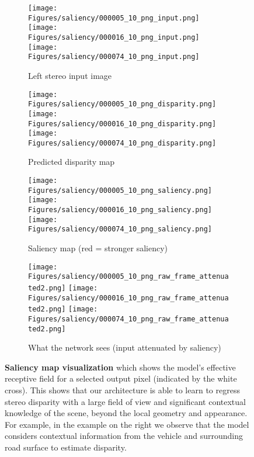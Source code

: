 \documentclass[10pt,twocolumn,letterpaper]{article}
\begin{document}
\begin{figure}[t]
	\begin{center}
    		\begin{subfigure}[t]{\linewidth}
            \centering
            \texttt{[image: Figures/saliency/000005\_10\_png\_input.png]}
            \texttt{[image: Figures/saliency/000016\_10\_png\_input.png]}
            \texttt{[image: Figures/saliency/000074\_10\_png\_input.png]}
	        \caption{Left stereo input image}
		\end{subfigure}
    		\begin{subfigure}[t]{\linewidth}
            \centering
            \texttt{[image: Figures/saliency/000005\_10\_png\_disparity.png]}
            \texttt{[image: Figures/saliency/000016\_10\_png\_disparity.png]}
            \texttt{[image: Figures/saliency/000074\_10\_png\_disparity.png]}
	        \caption{Predicted disparity map}
		\end{subfigure}
    		\begin{subfigure}[t]{\linewidth}
            \centering
            \texttt{[image: Figures/saliency/000005\_10\_png\_saliency.png]}
            \texttt{[image: Figures/saliency/000016\_10\_png\_saliency.png]}
            \texttt{[image: Figures/saliency/000074\_10\_png\_saliency.png]}
	        \caption{Saliency map (red = stronger saliency)}
		\end{subfigure}
    		\begin{subfigure}[t]{\linewidth}
            \centering
            \texttt{[image: Figures/saliency/000005\_10\_png\_raw\_frame\_attenuated2.png]}
            \texttt{[image: Figures/saliency/000016\_10\_png\_raw\_frame\_attenuated2.png]}
            \texttt{[image: Figures/saliency/000074\_10\_png\_raw\_frame\_attenuated2.png]}
	        \caption{What the network sees (input attenuated by saliency)}
		\end{subfigure}
	\end{center}
    \vspace{-2mm}
	\caption{\textbf{Saliency map visualization} which shows the model's effective receptive field for a selected output pixel (indicated by the white cross). This shows that our architecture is able to learn to regress stereo disparity with a large field of view and significant contextual knowledge of the scene, beyond the local geometry and appearance. For example, in the example on the right we observe that the model considers contextual information from the vehicle and surrounding road surface to estimate disparity.}
	\label{fig:saliency}
\end{figure}
\end{document}
